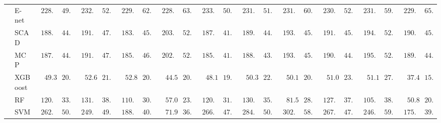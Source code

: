 \begin{tabular}{ll|ll|llllll|llllll|llllll}
 & E-net  & $\phantom{0}228.51$ & $\phantom{0}49.35$ & $\phantom{0}232.95$ & $\phantom{0}52.45$ & $\phantom{0}229.53$ & $\phantom{0}62.87$ & $\phantom{0}228.49$ & $\phantom{0}63.23$ & $\phantom{0}233.97$ & $\phantom{0}50.62$ & $\phantom{0}231.89$ & $\phantom{0}51.32$ & $\phantom{0}231.61$ & $\phantom{0}60.01$ & $\phantom{0}230.51$ & $\phantom{0}52.17$ & $\phantom{0}231.97$ & $\phantom{0}59.23$ & $\phantom{0}229.19$ & $\phantom{0}65.36$ \\
 & SCAD  & $\phantom{0}188.46$ & $\phantom{0}44.11$ & $\phantom{0}191.52$ & $\phantom{0}47.54$ & $\phantom{0}183.35$ & $\phantom{0}45.61$ & $\phantom{0}203.16$ & $\phantom{0}52.10$ & $\phantom{0}187.53$ & $\phantom{0}41.85$ & $\phantom{0}189.40$ & $\phantom{0}44.09$ & $\phantom{0}193.42$ & $\phantom{0}45.37$ & $\phantom{0}191.68$ & $\phantom{0}45.29$ & $\phantom{0}194.93$ & $\phantom{0}52.10$ & $\phantom{0}190.05$ & $\phantom{0}45.17$ \\
 & MCP  & $\phantom{0}187.53$ & $\phantom{0}44.11$ & $\phantom{0}191.81$ & $\phantom{0}47.35$ & $\phantom{0}185.29$ & $\phantom{0}46.61$ & $\phantom{0}202.55$ & $\phantom{0}52.13$ & $\phantom{0}185.95$ & $\phantom{0}41.10$ & $\phantom{0}188.94$ & $\phantom{0}43.52$ & $\phantom{0}193.67$ & $\phantom{0}45.63$ & $\phantom{0}190.86$ & $\phantom{0}44.64$ & $\phantom{0}195.24$ & $\phantom{0}52.51$ & $\phantom{0}189.40$ & $\phantom{0}44.01$ \\
 & XGBoost  & $\phantom{00}49.38$ & $\phantom{0}20.14$ & $\phantom{00}52.66$ & $\phantom{0}21.06$ & $\phantom{00}52.80$ & $\phantom{0}20.08$ & $\phantom{00}44.58$ & $\phantom{0}20.34$ & $\phantom{00}48.15$ & $\phantom{0}19.94$ & $\phantom{00}50.34$ & $\phantom{0}22.23$ & $\phantom{00}50.11$ & $\phantom{0}20.98$ & $\phantom{00}51.03$ & $\phantom{0}23.54$ & $\phantom{00}51.18$ & $\phantom{0}27.73$ & $\phantom{00}37.42$ & $\phantom{0}15.00$ \\
 & RF  & $\phantom{0}120.50$ & $\phantom{0}33.31$ & $\phantom{0}131.89$ & $\phantom{0}38.30$ & $\phantom{0}110.43$ & $\phantom{0}30.34$ & $\phantom{00}57.06$ & $\phantom{0}23.27$ & $\phantom{0}120.12$ & $\phantom{0}31.62$ & $\phantom{0}130.23$ & $\phantom{0}35.57$ & $\phantom{00}81.58$ & $\phantom{0}28.55$ & $\phantom{0}127.42$ & $\phantom{0}37.25$ & $\phantom{0}105.79$ & $\phantom{0}38.66$ & $\phantom{00}50.84$ & $\phantom{0}20.46$ \\
 & SVM  & $\phantom{0}262.24$ & $\phantom{0}50.48$ & $\phantom{0}249.18$ & $\phantom{0}49.91$ & $\phantom{0}188.26$ & $\phantom{0}40.89$ & $\phantom{00}71.91$ & $\phantom{0}36.45$ & $\phantom{0}266.25$ & $\phantom{0}47.08$ & $\phantom{0}284.46$ & $\phantom{0}50.94$ & $\phantom{0}302.19$ & $\phantom{0}58.79$ & $\phantom{0}267.24$ & $\phantom{0}47.41$ & $\phantom{0}246.31$ & $\phantom{0}59.10$ & $\phantom{0}175.19$ & $\phantom{0}39.40$ \\\hline

\end{tabular}
